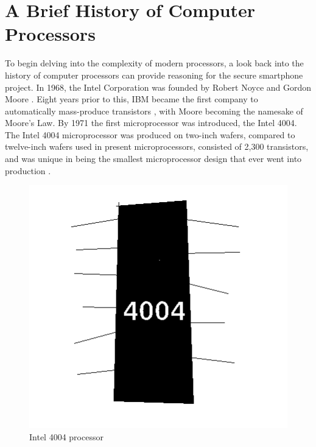 
\section{A Brief History of Computer Processors}

To begin delving into the complexity of modern processors, a look back into the history of computer processors can provide reasoning for the secure smartphone project. 
In 1968, the Intel Corporation was founded by Robert Noyce and Gordon Moore \cite{RN2}. Eight years prior to this, IBM became the first company to automatically mass-produce transistors \cite{RN2}, with Moore becoming the namesake of Moore’s Law. By 1971 the first microprocessor was introduced, the Intel 4004. The Intel 4004 microprocessor was produced on two-inch wafers, compared to twelve-inch wafers used in present microprocessors, consisted of 2,300 transistors, and was unique in being the smallest microprocessor design that ever went into production \cite{RN5}.

\begin{figure}
	\includegraphics[width=\linewidth]{4004.jpg}
	\caption{Intel 4004 processor \cite{RN9}}
	\label{fig:4004}
\end{figure}

